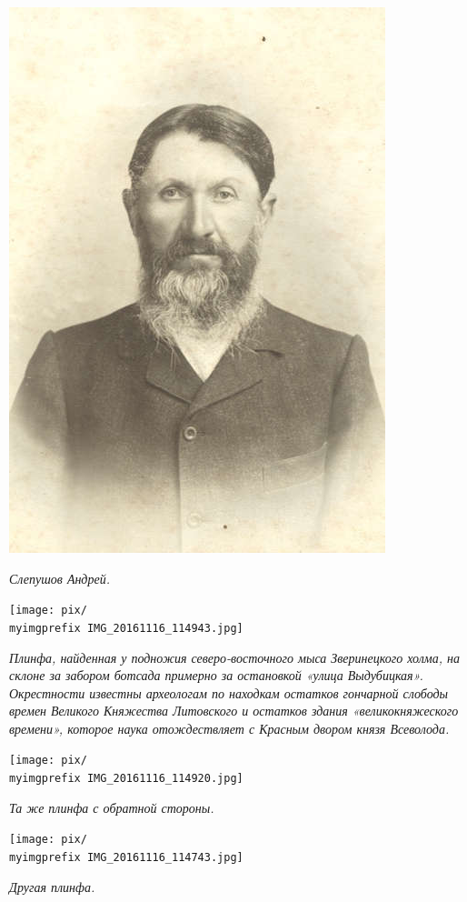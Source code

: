 \begin{center}
\includegraphics[width=0.50\linewidth]{faces/slepushov.jpg}

\textit{Слепушов Андрей.}
\end{center} 

\newpage
\begin{center}
\texttt{[image: pix/\\myimgprefix IMG\_20161116\_114943.jpg]}


\textit{Плинфа, найденная у подножия северо-восточного мыса Зверинецкого холма, на склоне за забором ботсада примерно за остановкой «улица Выдубицкая». Окрестности известны археологам по находкам остатков гончарной слободы времен Великого Княжества Литовского и остатков здания «великокняжеского времени», которое наука отождествляет с Красным двором князя Всеволода.}
\end{center} 

\newpage

\begin{center}
\texttt{[image: pix/\\myimgprefix IMG\_20161116\_114920.jpg]}

\textit{Та же плинфа с обратной стороны.}
\end{center} 

\begin{center}
\texttt{[image: pix/\\myimgprefix IMG\_20161116\_114743.jpg]}

\textit{Другая плинфа.}
\end{center} 


\newpage


